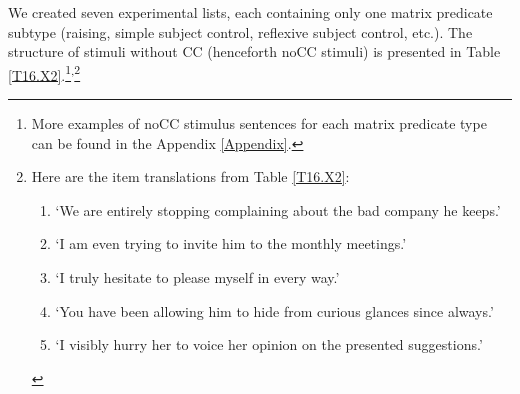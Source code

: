 We created seven experimental lists, each containing only one matrix predicate subtype (raising, simple subject control, reflexive subject control, etc.). The structure of stimuli without CC (henceforth noCC stimuli) is presented in Table \ref{T16.X2}.\footnote{More examples of noCC stimulus sentences for each matrix predicate type can be found in the Appendix \ref{Appendix}.}\textsuperscript{,}\footnote{Here are the item translations from Table \ref{T16.X2}:
\begin{enumerate}[label=(I\thechapter.\arabic*)]
    \item[\refstepcounter{enumi}\REF{I16.1}]  ‘We are entirely stopping complaining about the bad company he keeps.’
	\item[\refstepcounter{enumi}\REF{I16.2}] ‘I am even trying to invite him to the monthly meetings.’
	\item[\refstepcounter{enumi}\REF{I16.3}] ‘I truly hesitate to please myself in every way.’
	\item[\refstepcounter{enumi}\REF{I16.4}] ‘You have been allowing him to hide from curious glances since always.’
	\item[\refstepcounter{enumi}\REF{I16.5}] ‘I visibly hurry her to voice her opinion on the presented suggestions.’
\end{enumerate}
}

\begin{table}
\caption[Structure of noCC stimuli]{Structure of noCC stimuli\label{T16.X2}}
\end{table}

